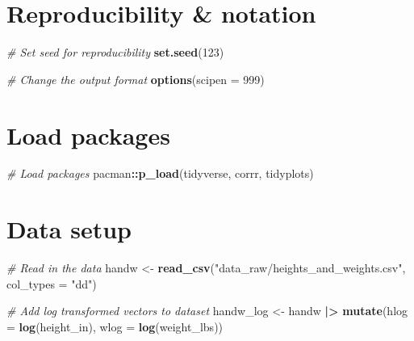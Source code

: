 \documentclass[
]{article}
\newenvironment{Shaded}{\begin{snugshade}}{\end{snugshade}}
\newcommand{\AttributeTok}[1]{\textcolor[rgb]{0.13,0.29,0.53}{#1}}
\newcommand{\CommentTok}[1]{\textcolor[rgb]{0.56,0.35,0.01}{\textit{#1}}}
\newcommand{\DecValTok}[1]{\textcolor[rgb]{0.00,0.00,0.81}{#1}}
\newcommand{\FunctionTok}[1]{\textcolor[rgb]{0.13,0.29,0.53}{\textbf{#1}}}
\newcommand{\NormalTok}[1]{#1}
\newcommand{\OtherTok}[1]{\textcolor[rgb]{0.56,0.35,0.01}{#1}}
\newcommand{\SpecialCharTok}[1]{\textcolor[rgb]{0.81,0.36,0.00}{\textbf{#1}}}
\newcommand{\StringTok}[1]{\textcolor[rgb]{0.31,0.60,0.02}{#1}}
\begin{document}
\hypertarget{reproducibility-notation}{%
\section{Reproducibility \& notation}\label{reproducibility-notation}}

\begin{Shaded}
\begin{Highlighting}[]
\CommentTok{\# Set seed for reproducibility}
\FunctionTok{set.seed}\NormalTok{(}\DecValTok{123}\NormalTok{)}

\CommentTok{\# Change the output format}
\FunctionTok{options}\NormalTok{(}\AttributeTok{scipen =} \DecValTok{999}\NormalTok{)}
\end{Highlighting}
\end{Shaded}

\hypertarget{load-packages}{%
\section{Load packages}\label{load-packages}}

\begin{Shaded}
\begin{Highlighting}[]
\CommentTok{\# Load packages}
\NormalTok{pacman}\SpecialCharTok{::}\FunctionTok{p\_load}\NormalTok{(tidyverse,}
\NormalTok{               corrr,}
\NormalTok{               tidyplots)}
\end{Highlighting}
\end{Shaded}

\hypertarget{data-setup}{%
\section{Data setup}\label{data-setup}}

\begin{Shaded}
\begin{Highlighting}[]
\CommentTok{\# Read in the data}
\NormalTok{handw }\OtherTok{\textless{}{-}}
  \FunctionTok{read\_csv}\NormalTok{(}\StringTok{"data\_raw/heights\_and\_weights.csv"}\NormalTok{,}
           \AttributeTok{col\_types =} \StringTok{"dd"}\NormalTok{)}


\CommentTok{\# Add log transformed vectors to dataset}
\NormalTok{handw\_log }\OtherTok{\textless{}{-}}
\NormalTok{  handw }\SpecialCharTok{|\textgreater{}}
  \FunctionTok{mutate}\NormalTok{(}\AttributeTok{hlog =} \FunctionTok{log}\NormalTok{(height\_in),  }
         \AttributeTok{wlog =} \FunctionTok{log}\NormalTok{(weight\_lbs))}
\end{Highlighting}
\end{Shaded}
\end{document}

